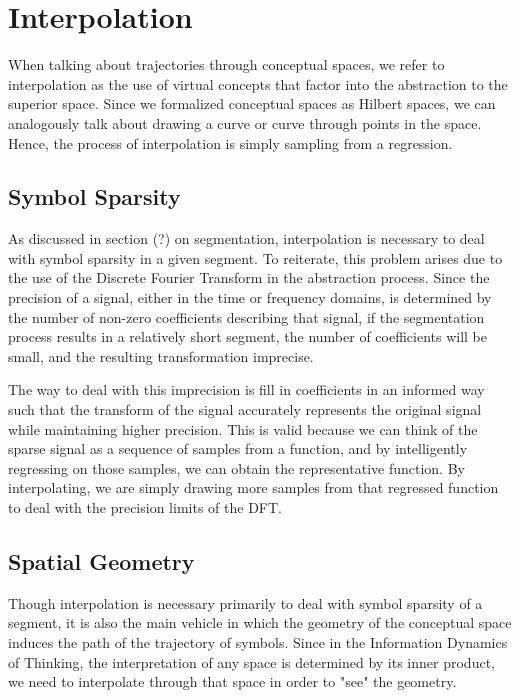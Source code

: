 \section{Interpolation}
When talking about trajectories through conceptual spaces, we refer to interpolation as the use of virtual concepts that factor into the abstraction to the superior space.  Since we formalized conceptual spaces as Hilbert spaces, we can analogously talk about drawing a curve or curve through points in the space.  Hence, the process of interpolation is simply sampling from a regression.

\subsection{Symbol Sparsity}
As discussed in section (?) on segmentation, interpolation is necessary to deal with symbol sparsity in a given segment.  To reiterate, this problem arises due to the use of the Discrete Fourier Transform in the abstraction process.  Since the precision of a signal, either in the time or frequency domains, is determined by the number of non-zero coefficients describing that signal, if the segmentation process results in a relatively short segment, the number of coefficients will be small, and the resulting transformation imprecise.

The way to deal with this imprecision is fill in coefficients in an informed way such that the transform of the signal accurately represents the original signal while maintaining higher precision.  This is valid because we can think of the sparse signal as a sequence of samples from a function, and by intelligently regressing on those samples, we can obtain the representative function.  By interpolating, we are simply drawing more samples from that regressed function to deal with the precision limits of the DFT.

\subsection{Spatial Geometry}
Though interpolation is necessary primarily to deal with symbol sparsity of a segment, it is also the main vehicle in which the geometry of the conceptual space induces the path of the trajectory of symbols.  Since in the Information Dynamics of Thinking, the interpretation of any space is determined by its inner product, we need to interpolate through that space in order to "see" the geometry.

